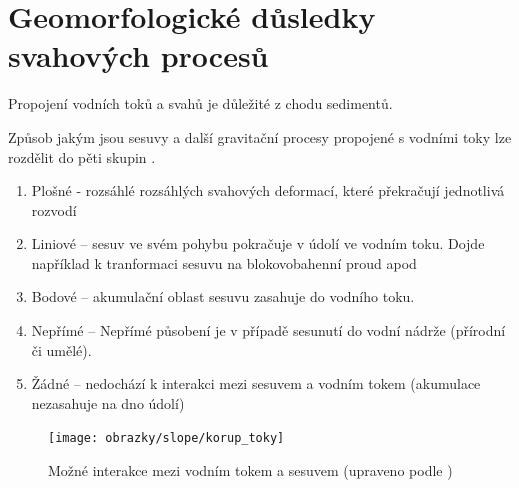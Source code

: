 \section{Geomorfologické důsledky svahových procesů}
Propojení vodních toků a svahů je důležité z chodu sedimentů. 


Způsob jakým jsou sesuvy a další gravitační procesy propojené s vodními toky lze rozdělit do pěti skupin \parencite{korupGeomorphicImprintLandslides2005}. 

\begin{enumerate}
	\item Plošné - rozsáhlé rozsáhlých svahových deformací, které překračují jednotlivá rozvodí
	\item Liniové -- sesuv ve svém pohybu pokračuje v údolí ve vodním toku. Dojde například k tranformaci sesuvu na blokovobahenní proud apod
	\item Bodové -- akumulační oblast sesuvu zasahuje do vodního toku.
	\item Nepřímé -- Nepřímé působení je v případě sesunutí do vodní nádrže (přírodní či umělé).
	\item Žádné -- nedochází k interakci mezi sesuvem a vodním tokem (akumulace nezasahuje na dno údolí)
\end{enumerate}

\begin{figure}[h]
	\centering
	\texttt{[image: obrazky/slope/korup\_toky]}
	\caption{Možné interakce mezi vodním tokem a sesuvem (upraveno podle \textcite{korupGeomorphicImprintLandslides2005})}
	\label{fig:koruptoky}
\end{figure}



